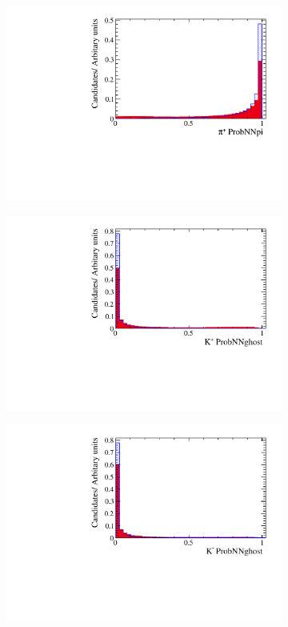 \begin{figure}[!h]
\begin{subfigure}[t]{0.22\textwidth}
      \includegraphics[width=1.0\textwidth]{figs/Selection/Ds_BDT_Var_Ds2KKPi_D_P_MC15TuneV1_ProbNNpi.pdf}
   \end{subfigure}
   \begin{subfigure}[t]{0.22\textwidth}
      \centering
      \includegraphics[width=1.0\textwidth]{figs/Selection/Ds_BDT_Var_Ds2KKPi_D_K0_MC15TuneV1_ProbNNghost.pdf}
   \end{subfigure}
   \begin{subfigure}[t]{0.22\textwidth}
      \centering
      \includegraphics[width=1.0\textwidth]{figs/Selection/Ds_BDT_Var_Ds2KKPi_D_K1_MC15TuneV1_ProbNNghost.pdf}

\end{subfigure}
\end{figure}

